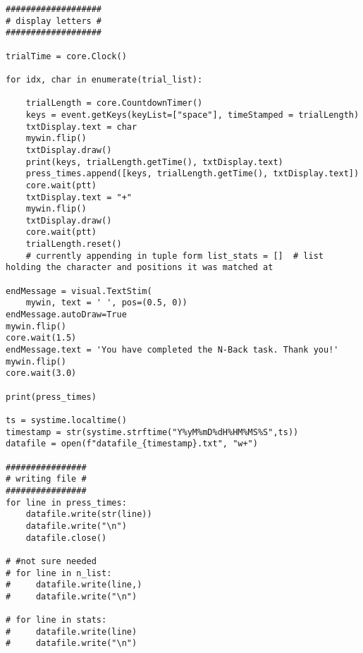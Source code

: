 \documentclass{article}
\begin{document}
\begin{verbatim}
###################
# display letters #
###################

trialTime = core.Clock()

for idx, char in enumerate(trial_list):

    trialLength = core.CountdownTimer()
    keys = event.getKeys(keyList=["space"], timeStamped = trialLength)
    txtDisplay.text = char
    mywin.flip()
    txtDisplay.draw()
    print(keys, trialLength.getTime(), txtDisplay.text)
    press_times.append([keys, trialLength.getTime(), txtDisplay.text])
    core.wait(ptt)
    txtDisplay.text = "+"
    mywin.flip()
    txtDisplay.draw()
    core.wait(ptt)
    trialLength.reset()
    # currently appending in tuple form list_stats = []  # list holding the character and positions it was matched at

endMessage = visual.TextStim(
    mywin, text = ' ', pos=(0.5, 0))
endMessage.autoDraw=True
mywin.flip()
core.wait(1.5)
endMessage.text = 'You have completed the N-Back task. Thank you!'
mywin.flip()
core.wait(3.0)

print(press_times)

ts = systime.localtime()
timestamp = str(systime.strftime("Y%yM%mD%dH%HM%MS%S",ts))
datafile = open(f"datafile_{timestamp}.txt", "w+")

################
# writing file #
################
for line in press_times:
    datafile.write(str(line))
    datafile.write("\n")
    datafile.close()

# #not sure needed
# for line in n_list:
#     datafile.write(line,)
#     datafile.write("\n")

# for line in stats:
#     datafile.write(line)
#     datafile.write("\n")

\end{verbatim}
\end{document}
